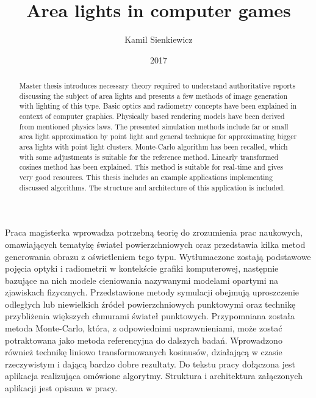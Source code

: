 \documentclass[pl]{minipw/minipw}
\title{Area lights in computer games}
\author{Kamil Sienkiewicz}
\date{2017}
\begin{document}
\sloppy
\setcounter{page}{1}

\begin{streszczenie}
Praca magisterka wprowadza potrzebną teorię do zrozumienia prac naukowych, omawiających tematykę świateł powierzchniowych oraz przedstawia kilka metod generowania obrazu z oświetleniem tego typu. Wytłumaczone zostają podstawowe pojęcia optyki i radiometrii w kontekście grafiki komputerowej, następnie bazujące na nich modele cieniowania nazywanymi modelami opartymi na zjawiskach fizycznych. Przedstawione metody symulacji obejmują uproszczenie odległych lub niewielkich źródeł powierzchniowych punktowymi oraz technikę przybliżenia większych chmurami świateł punktowych. Przypomniana została metoda Monte-Carlo, która, z odpowiednimi usprawnieniami, może zostać potraktowana jako metoda referencyjna do dalszych badań. Wprowadzono również technikę liniowo transformowanych kosinusów, działającą w czasie rzeczywistym i dającą bardzo dobre rezultaty. Do tekstu pracy dołączona jest aplikacja realizująca omówione algorytmy. Struktura i architektura załączonych aplikacji jest opisana w pracy.
\end{streszczenie}

\begin{abstract}
Master thesis introduces necessary theory required to understand authoritative reports discussing the subject of area lights and presents a few methods of image generation with lighting of this type. Basic optics and radiometry concepts have been explained in context of computer graphics. Physically based rendering models have been derived from mentioned physics laws. The presented simulation methods include far or small area light approximation by point light and general technique for approximating bigger area lights with point light clusters. Monte-Carlo algorithm has been recalled, which with some adjustments is suitable for the reference method. Linearly transformed cosines method has been explained. This method is suitable for real-time and gives very good resources. This thesis includes an example applications implementing discussed algorithms. The structure and architecture of this application is included.
\end{abstract}

\makestatement

\cleardoublepage
\tableofcontents


\cleardoublepage
\pagestyle{fancy}










\cleardoublepage
\begin{appendices}

\end{appendices}

\printbibliography
\end{document}
